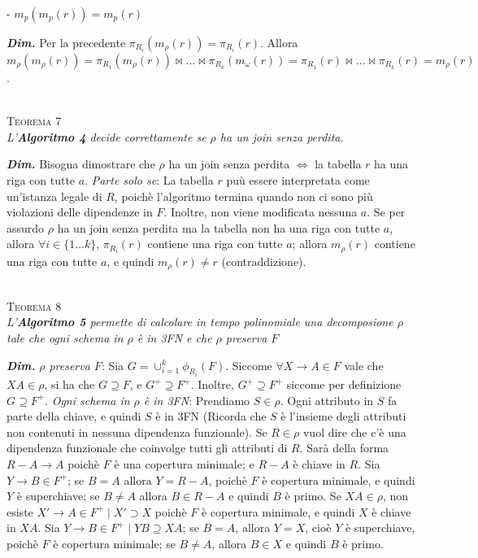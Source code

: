 \documentclass[a4paper,10pt]{article} %
\newcommand{\dimo}[1]{%
    \par \hfill\begin{minipage}{0.99\linewidth}{ \tiny {\textbf{\em{Dim.}}} {#1} }\end{minipage}}
\newcommand{\mtheorem}[1]{%
    {\hspace*{-10pt} \textsc {#1}}}
\begin{document}
        - $m_p(m_p(r)) = m_p(r)$
        \dimo{
            Per la precedente $\pi_{R_i}(m_\rho(r)) = \pi_{R_i}(r)$. Allora $m_\rho(m_\rho(r)) = \pi_{R_1}(m_\rho(r)) \bowtie \ldots \bowtie \pi_{R_k}(m_\omega(r)) = \pi_{R_1}(r) \bowtie \ldots \bowtie \pi_{R_k}(r) = m_\rho(r)$.
        }
    \\[1ex]
    \mtheorem {Teorema 7}\\
        \emph{L'\textbf{Algoritmo 4} decide correttamente se $\rho$ ha un join senza perdita.}
        \dimo{
            Bisogna dimostrare che $\rho$ ha un join senza perdita $\Leftrightarrow$ la tabella $r$ ha una riga con tutte $a$.
            \emph{Parte solo se}: La tabella $r$ puù essere interpretata come un'istanza legale di $R$, poichè l'algoritmo termina quando non ci sono più violazioni delle dipendenze in $F$. Inoltre, non viene modificata nessuna $a$. Se per assurdo $\rho$ ha un join senza perdita ma la tabella non ha una riga con tutte $a$, allora $\forall i \in \{ 1 \ldots k \}$, $\pi_{R_i}(r)$ contiene una riga con tutte $a$; allora $m_\rho(r)$ contiene una riga con tutte $a$, e quindi $m_\rho(r) \neq r$ (contraddizione).
        }
    \\[1ex]
    \mtheorem {Teorema 8}\\
        \emph{L'\textbf{Algoritmo 5} permette di calcolare in tempo polinomiale una decomposione $\rho$ tale che ogni schema in $\rho$ è in 3FN e che $\rho$ preserva $F$}
        \dimo{
            \emph{$\rho$ preserva $F$}: Sia $G = \cup_{i=1}^k \phi_{R_i}(F)$. Siccome $\forall X \rightarrow A \in F$ vale che $XA \in \rho$, si ha che $G \supseteq F$, e $G^+ \supseteq F^+$. Inoltre, $G^+ \supseteq F^+$ siccome per definizione $G \supseteq F^+$.
            \emph{Ogni schema in $\rho$ è in 3FN}: Prendiamo $S \in \rho$. Ogni attributo in $S$ fa parte della chiave, e quindi $S$ è in 3FN (Ricorda che $S$ è l'insieme degli attributi non contenuti in nessuna dipendenza funzionale). Se $R \in \rho$ vuol dire che c'è una dipendenza funzionale che coinvolge tutti gli attributi di $R$. Sarà della forma $R - A \rightarrow A$ poichè $F$ è una copertura minimale; e $R - A$ è chiave in $R$. Sia $Y \rightarrow B \in F^+$; se $B = A$ allora $Y = R - A$, poichè $F$ è copertura minimale, e quindi $Y$ è superchiave; se $B \neq A$ allora $B \in R - A$ e quindi $B$ è primo. Se $XA \in \rho$, non esiste $X' \rightarrow A \in F^+ \; | \; X' \supset X$ poichè $F$ è copertura minimale, e quindi $X$ è chiave in $XA$. Sia $Y \rightarrow B \in F^+ \; | \; YB \supseteq XA$; se $B = A$, allora $Y = X$, cioè $Y$ è superchiave, poichè $F$ è copertura minimale; se $B \neq A$, allora $B \in X$ e quindi $B$ è primo.
        }
\end{document}
